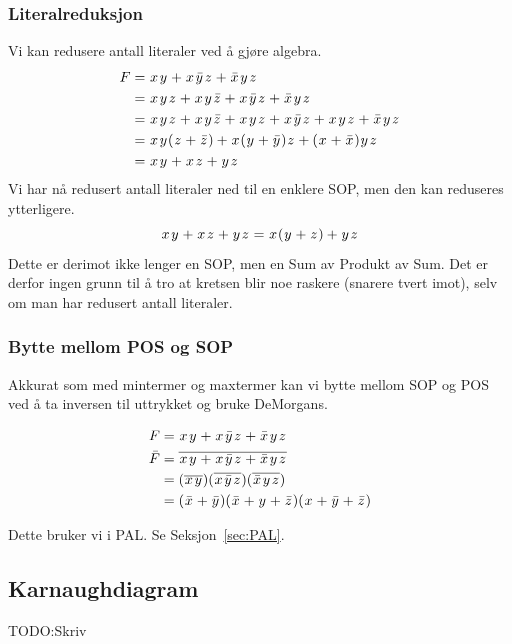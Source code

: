 \documentclass[12pt,a4paper,norsk]{article}
\begin{document}
\subsubsection{Literalreduksjon}
Vi kan redusere antall literaler ved å gjøre algebra.
\begin{align*}
  F &= \var{x}\var{y} + \var{x}\kom{y}\var{z} + \kom{x}\var{y}\var{z} \\
    &= \var{x}\var{y}\var{z} + \var{x}\var{y}\kom{z} + \var{x}\kom{y}\var{z} + \kom{x}\var{y}\var{z} \\
    &= \var{x}\var{y}\var{z} + \var{x}\var{y}\kom{z} + \var{x}\var{y}\var{z} + \var{x}\kom{y}\var{z} + \var{x}\var{y}\var{z} + \kom{x}\var{y}\var{z} \\
    &= \var{x}\var{y}(\var{z} + \kom{z}) + \var{x}(\var{y} + \kom{y})\var{z} + (\var{x} + \kom{x})\var{y}\var{z} \\
    &= \var{x}\var{y} + \var{x}\var{z} + \var{y}\var{z}
\end{align*}
Vi har nå redusert antall literaler ned til en enklere SOP, men den kan
reduseres ytterligere.
\[\var{x}\var{y} + \var{x}\var{z} + \var{y}\var{z} = \var{x}(\var{y} + \var{z}) + \var{y}\var{z}\]
Dette er derimot ikke lenger en SOP, men en Sum av Produkt av Sum. Det er derfor
ingen grunn til å tro at kretsen blir noe raskere (snarere tvert imot), selv om
man har redusert antall literaler.

\subsubsection{Bytte mellom POS og SOP}
Akkurat som med mintermer og maxtermer kan vi bytte mellom SOP og POS ved å ta
inversen til uttrykket og bruke DeMorgans.

\begin{align*}
  F &= \var{x}\var{y} + \var{x}\kom{y}\var{z} + \kom{x}\var{y}\var{z} \\
  \bar{F} &= \overline{\var{x}\var{y} + \var{x}\kom{y}\var{z} + \kom{x}\var{y}\var{z}} \\
    &= (\overline{\var{x}\var{y}})(\overline{\var{x}\kom{y}\var{z}})(\overline{\kom{x}\var{y}\var{z}}) \\
    &= (\kom{x} + \kom{y})(\kom{x}+\var{y}+\kom{z})(\var{x}+\kom{y}+\kom{z})
\end{align*}

Dette bruker vi i PAL. Se Seksjon~\ref{sec:PAL}.

\subsection{Karnaughdiagram}
TODO\@:Skriv
\end{document}
